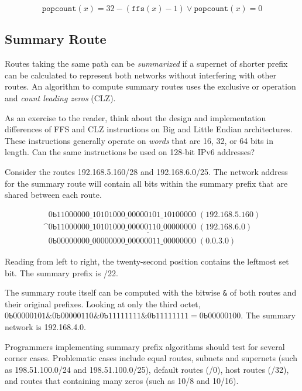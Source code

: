 \documentclass{book}
\begin{document}
\[
\texttt{popcount}(x) = 32 - (\texttt{ffs}(x) - 1) \vee \texttt{popcount}(x) = 0
\]

\subsection{Summary Route}

Routes taking the same path can be \textit{summarized} if a supernet of shorter prefix can be calculated to represent both networks without interfering with other routes. An algorithm to compute summary routes uses the exclusive or operation and \textit{count leading zeros} (CLZ).

As an exercise to the reader, think about the design and implementation differences of FFS and CLZ instructions on Big and Little Endian architectures. These instructions generally operate on \textit{words} that are 16, 32, or 64 bits in length. Can the same instructions be used on 128-bit IPv6 addresses?

Consider the routes 192.168.5.160/28 and 192.168.6.0/25. The network address for the summary route will contain all bits within the summary prefix that are shared between each route.

\begin{equation*}
\begin{array}{c}
\phantom{\texttt{\textasciicircum}} 0\texttt{b}11000000\_10101000\_00000101\_10100000 \phantom{.}(192.168.5.160) \\
\underline{\texttt{\textasciicircum} 0\texttt{b}11000000\_10101000\_00000110\_00000000 \phantom{.}(192.168.6.0)}\phantom{9}\phantom{9}  \\
\phantom{\texttt{\textasciicircum}} 0\texttt{b}00000000\_00000000\_00000011\_00000000 \phantom{.}(0.0.3.0)\phantom{9}\phantom{9}\phantom{9}\phantom{9}\phantom{9}\phantom{9}
\end{array}
\end{equation*}

Reading from left to right, the twenty-second position contains the leftmost set bit. The summary prefix is /22.

The summary route itself can be computed with the bitwise \texttt{\&} of both routes and their original prefixes. Looking at only the third octet, $0\texttt{b}00000101 \& 0\texttt{b}00000110 \& 0\texttt{b}11111111 \& 0\texttt{b}11111111 = 0\texttt{b}00000100$. The summary network is 192.168.4.0.

Programmers implementing summary prefix algorithms should test for several corner cases. Problematic cases include equal routes, subnets and supernets (such as 198.51.100.0/24 and 198.51.100.0/25), default routes (/0), host routes (/32), and routes that containing many zeros (such as 10/8 and 10/16).
\end{document}
